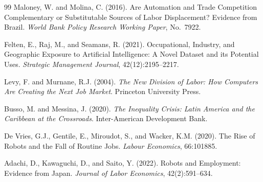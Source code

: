 \documentclass{article}
\begin{document}
\begin{thebibliography}{99}
Maloney, W. and Molina, C. (2016). Are Automation and Trade Competition Complementary or Substitutable Sources of Labor Displacement? Evidence from Brazil. \textit{World Bank Policy Research Working Paper}, No.~7922.

Felten, E., Raj, M., and Seamans, R. (2021). Occupational, Industry, and Geographic Exposure to Artificial Intelligence: A Novel Dataset and its Potential Uses. \textit{Strategic Management Journal}, 42(12):2195--2217.

Levy, F. and Murnane, R.J. (2004). \textit{The New Division of Labor: How Computers Are Creating the Next Job Market}. Princeton University Press.

Busso, M. and Messina, J. (2020). \textit{The Inequality Crisis: Latin America and the Caribbean at the Crossroads}. Inter-American Development Bank.


De Vries, G.J., Gentile, E., Miroudot, S., and Wacker, K.M. (2020). The Rise of Robots and the Fall of Routine Jobs. \textit{Labour Economics}, 66:101885.

Adachi, D., Kawaguchi, D., and Saito, Y. (2022). Robots and Employment: Evidence from Japan. \textit{Journal of Labor Economics}, 42(2):591--634.

\end{thebibliography}
\end{document}
